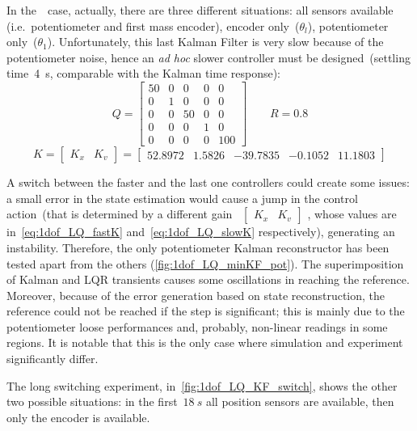 In the~\onedof\ case, actually, there are three different situations: all sensors available (i.e.~potentiometer and first mass encoder), encoder only~($\theta_l$), potentiometer only~($\theta_1$). Unfortunately, this last Kalman Filter is very slow because of the potentiometer noise, hence an \textit{ad hoc} slower controller must be designed~(settling time~4~s, comparable with the Kalman time response):
\[
	Q =
	\begin{bmatrix}
		50 & 0 & 0 & 0 & 0 \\
		0 & 1 & 0 & 0 & 0 \\
		0 & 0 & 50 & 0 & 0 \\
		0 & 0 & 0 & 1 & 0 \\
		0 & 0 & 0 & 0 & 100
	\end{bmatrix}
	\qquad
	R = 0.8
\]
\begin{equation}
	K =
	\left[
	\begin{array}{c|c}
		K_x & K_v
	\end{array}
	\right]
	=
	\left[
	\begin{array}{cccc|c}
		52.8972 & 1.5826 & -39.7835 & -0.1052 & 11.1803
	\end{array}
	\right]
	\label{eq:1dof_LQ_slowK}
\end{equation}

A switch between the faster and the last one controllers could create some issues: a small error in the state estimation would cause a jump in the control action~(that is determined by a different gain~
$
\left[
	\begin{array}{c|c}
		K_x & K_v
	\end{array}
\right]
$
, whose values are in~\cref{eq:1dof_LQ_fastK} and~\cref{eq:1dof_LQ_slowK} respectively), generating an instability. Therefore, the only potentiometer Kalman reconstructor has been tested apart from the others (\cref{fig:1dof_LQ_minKF_pot}). The superimposition of Kalman and LQR transients causes some oscillations in reaching the reference. Moreover, because of the error generation based on state reconstruction, the reference could not be reached if the step is significant; this is mainly due to the potentiometer loose performances and, probably, non-linear readings in some regions. It is notable that this is the only case where simulation and experiment significantly differ.

The long switching experiment, in~\cref{fig:1dof_LQ_KF_switch}, shows the other two possible situations: in the first~$18\ s$ all position sensors are available, then only the encoder is available.

